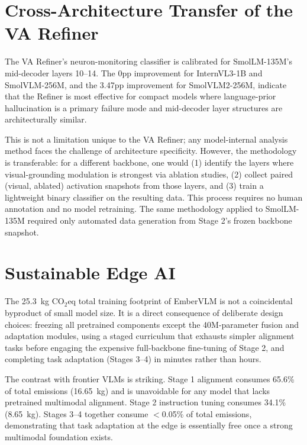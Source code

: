 \section{Cross-Architecture Transfer of the VA Refiner}
\label{sec:disc_va_transfer}

The VA Refiner's neuron-monitoring classifier is calibrated for SmolLM-135M's mid-decoder layers 10--14. The 0pp improvement for InternVL3-1B and SmolVLM-256M, and the 3.47pp improvement for SmolVLM2-256M, indicate that the Refiner is most effective for compact models where language-prior hallucination is a primary failure mode and mid-decoder layer structures are architecturally similar.

This is not a limitation unique to the VA Refiner; any model-internal analysis method faces the challenge of architecture specificity. However, the methodology is transferable: for a different backbone, one would (1) identify the layers where visual-grounding modulation is strongest via ablation studies, (2) collect paired (visual, ablated) activation snapshots from those layers, and (3) train a lightweight binary classifier on the resulting data. This process requires no human annotation and no model retraining. The same methodology applied to SmolLM-135M required only automated data generation from Stage 2's frozen backbone snapshot.

\section{Sustainable Edge AI}
\label{sec:disc_sustainability}

The 25.3~kg CO$_2$eq total training footprint of EmberVLM is not a coincidental byproduct of small model size. It is a direct consequence of deliberate design choices: freezing all pretrained components except the 40M-parameter fusion and adaptation modules, using a staged curriculum that exhausts simpler alignment tasks before engaging the expensive full-backbone fine-tuning of Stage 2, and completing task adaptation (Stages 3--4) in minutes rather than hours.

The contrast with frontier VLMs is striking. Stage 1 alignment consumes 65.6\% of total emissions (16.65~kg) and is unavoidable for any model that lacks pretrained multimodal alignment. Stage 2 instruction tuning consumes 34.1\% (8.65~kg). Stages 3--4 together consume $<$0.05\% of total emissions, demonstrating that task adaptation at the edge is essentially free once a strong multimodal foundation exists.

